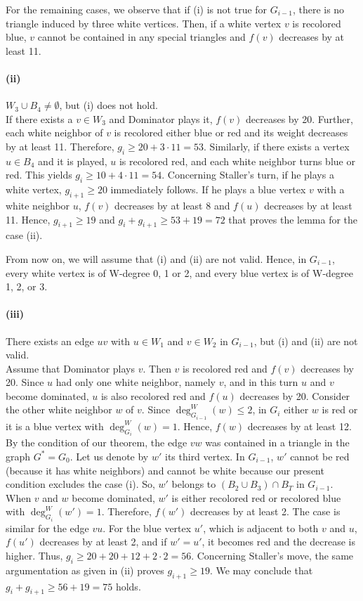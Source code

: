 \documentclass[12pt]{article}
\begin{document}
For the remaining cases, we observe that if (i) is not true for $G_{i-1}$, there is no  triangle induced by three white vertices. Then, if a white vertex $v$ is recolored blue,  $v$ cannot be contained in any special triangles and $f(v)$ decreases by at least 11.

\paragraph{(ii)} $W_3 \cup B_4 \neq \emptyset$, but (i) does not hold.\\
If there exists a $v\in W_3$ and Dominator plays it, $f(v)$ decreases by 20. Further, each  white neighbor of $v$ is recolored either blue or red and its weight decreases by at least 11. Therefore, $g_i \ge 20 + 3 \cdot 11 =53$. Similarly, if there exists a vertex $u \in B_4$ and it is played, $u$ is recolored red, and each white neighbor turns blue or red. This yields $g_i \ge 10 + 4 \cdot 11 =54$.
Concerning Staller's turn, if he plays a white vertex, $g_{i+1}\ge 20$ immediately follows. If he plays a blue vertex $v$ with a white neighbor $u$, $f(v)$ decreases by at least 8 and $f(u)$ decreases by at least 11. Hence, $g_{i+1}\ge 19$ and $g_i + g_{i+1}\ge 53+19=72$ that proves the lemma for the case (ii).
\medskip

From now on, we will assume that (i) and (ii) are not valid. Hence, in $G_{i-1}$, every white vertex is of W-degree 0, 1 or 2, and every blue vertex is of W-degree 1, 2, or 3.

\paragraph{(iii)} There exists an edge $uv$ with $u\in W_1$ and $v\in W_2$  in $G_{i-1}$, but (i) and (ii) are not valid.\\
Assume that Dominator plays $v$. Then $v$ is recolored red and $f(v)$ decreases by 20. Since $u$ had only one white neighbor, namely $v$, and in this turn $u$ and $v$ become  dominated, $u$ is also recolored red and $f(u)$ decreases by 20. Consider the other white neighbor $w$ of $v$. Since $\deg_{G_{i-1}}^W(w) \le 2$, in $G_i$ either $w$ is red or it is a blue vertex with $\deg_{G_{i}}^W(w)= 1$. Hence, $f(w)$ decreases by at least 12. By the condition of our theorem, the edge $vw$ was contained in a triangle in the graph $G^*=G_0$. Let us denote by $w'$ its third vertex. In $G_{i-1}$, $w'$ cannot be red (because it has white neighbors) and cannot be white because our present condition excludes the case (i). So, $w'$ belongs to $(B_2 \cup B_3)\cap B_T$ in $G_{i-1}$. When  $v$ and $w$ become dominated, $w'$ is either recolored red or recolored blue with $\deg_{G_{i}}^W(w')= 1$. Therefore, $f(w')$ decreases by at least 2.
The case is similar for the edge $vu$. For the blue vertex $u'$, which is adjacent to both $v$ and $u$, $f(u')$ decreases by at least 2, and if $w'=u'$, it becomes red and the decrease is higher. Thus, $g_i \ge 20 + 20+ 12+2\cdot 2 =56$. Concerning Staller's move, the same argumentation as given in (ii) proves $g_{i+1}\ge 19$. We may conclude that $g_i + g_{i+1}\ge 56+19=75$  holds.
\end{document}
